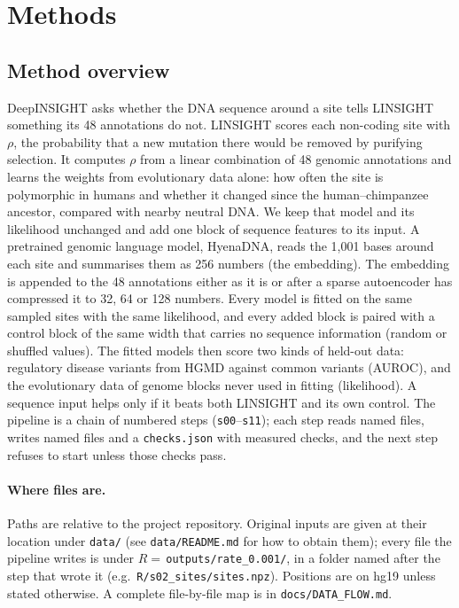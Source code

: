\documentclass[11pt]{article}
\newcommand{\file}[1]{\nolinkurl{#1}}
\begin{document}
\section*{Methods}

\subsection*{Method overview}
DeepINSIGHT asks whether the DNA sequence around a site tells LINSIGHT something its 48 annotations do
not. LINSIGHT scores each non-coding site with $\rho$, the probability that a new mutation there would be
removed by purifying selection. It computes $\rho$ from a linear combination of 48 genomic annotations and
learns the weights from evolutionary data alone: how often the site is polymorphic in humans and whether it
changed since the human--chimpanzee ancestor, compared with nearby neutral DNA. We keep that model and its
likelihood unchanged and add one block of sequence features to its input. A
pretrained genomic language model, HyenaDNA, reads the 1,001 bases around each site and summarises them as
256 numbers (the embedding). The embedding is appended to the 48 annotations either as it is or after a
sparse autoencoder has compressed it to 32, 64 or 128 numbers. Every model is fitted on the same sampled
sites with the same likelihood, and every added block is paired with a control block of the same width
that carries no sequence information (random or shuffled values). The fitted models then score two kinds
of held-out data: regulatory disease variants from HGMD against common variants (AUROC), and the
evolutionary data of genome blocks never used in fitting (likelihood). A sequence input helps only if it
beats both LINSIGHT and its own control. The pipeline is a chain of numbered steps
(\file{s00}--\file{s11}); each step reads named files, writes named files and a \file{checks.json} with
measured checks, and the next step refuses to start unless those checks pass.

\paragraph{Where files are.} Paths are relative to the project repository. Original inputs are given at
their location under \file{data/} (see \file{data/README.md} for how to obtain them); every file the pipeline writes is under
$R=$\,\file{outputs/rate_0.001/}, in a folder named after the step that wrote it
(e.g.\ \file{R/s02_sites/sites.npz}). Positions are on hg19 unless stated otherwise. A complete
file-by-file map is in \file{docs/DATA_FLOW.md}.
\end{document}
